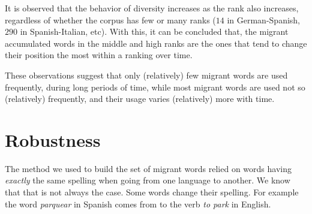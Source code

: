\documentclass[10pt,letterpaper]{article} %
\begin{document}
It is observed that the behavior of
diversity increases as the rank also increases, regardless of whether the
corpus has few or many ranks ($14$ in German-Spanish, $290$ in Spanish-Italian,
etc).  With this, it can be concluded that, the migrant accumulated words in the
middle and high ranks are the ones that tend to change their position the most
within a ranking over time.

These observations suggest that only (relatively) few migrant words are used frequently, during long periods of time, while most migrant words are used not so (relatively) frequently, and their usage varies (relatively) more with time. 



\section*{Robustness} %
The method we used to build the set of migrant words relied on words having {\it
exactly} the same spelling when going from one language to another. We know 
that that is not always the case. Some words change their spelling. For example
the word {\it parquear} in Spanish comes from to the verb {\it to park} in
English. 
\end{document}

